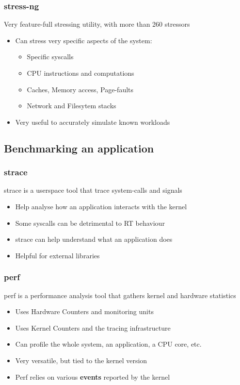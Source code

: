 \begin{frame}
	\frametitle{stress-ng}
	Very feature-full stressing utility, with more than 260 stressors
	\begin{itemize}
		\item Can stress very specific aspects of the system:
			\begin{itemize}
				\item Specific syscalls
				\item CPU instructions and computations
				\item Caches, Memory access, Page-faults
				\item Network and Filesytem stacks
			\end{itemize}
		\item Very useful to accurately simulate known workloads
	\end{itemize}
\end{frame}

\subsection{Benchmarking an application}
\begin{frame}
	\frametitle{strace}
	strace is a userspace tool that trace system-calls and signals
	\begin{itemize}
		\item Help analyse how an application interacts with the kernel
		\item Some syscalls can be detrimental to RT behaviour
		\item strace can help understand what an application does
		\item Helpful for external libraries
	\end{itemize}
\end{frame}

\begin{frame}
	\frametitle{perf}
	perf is a performance analysis tool that gathers kernel and hardware statistics
	\begin{itemize}
		\item Uses Hardware Counters and monitoring units
		\item Uses Kernel Counters and the tracing infrastructure
		\item Can profile the whole system, an application, a CPU core, etc.
		\item Very versatile, but tied to the kernel version
		\item Perf relies on various \textbf{events} reported by the kernel
	\end{itemize}
\end{frame}

